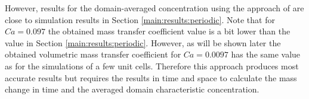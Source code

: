 \documentclass{article}
\begin{document}
However, results for the domain-averaged concentration using the approach of \citeauthor{vanbaten-circular} are close to simulation results in Section
\ref{main:results:periodic}. %
Note that for $Ca=0.097$ the obtained mass transfer coefficient value is a bit
lower than the value in Section \ref{main:results:periodic}. However, as will
be shown later the obtained volumetric mass transfer coefficient for
$Ca=0.0097$ has the same value as for the simulations of a few unit cells.
Therefore this approach produces most accurate results but requires the results
in time and space to calculate the mass change in time and the averaged domain
characteristic concentration.
\end{document}
